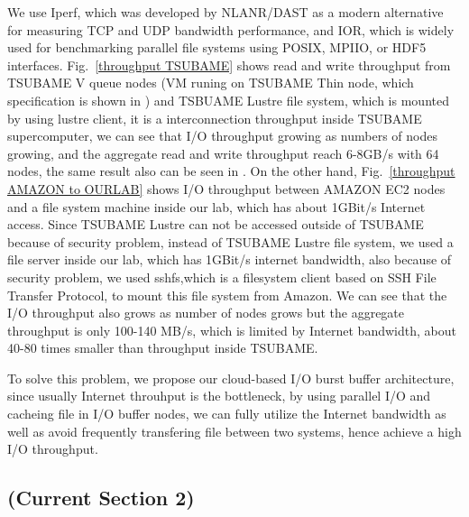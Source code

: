 We use Iperf\cite{iperf}, which was developed by NLANR/DAST as a modern alternative for measuring TCP and UDP bandwidth performance, and IOR\cite{IOR}, which is widely used for benchmarking parallel file systems using POSIX, MPIIO, or HDF5 interfaces.
Fig.~\ref{throughput TSUBAME} shows read and write throughput from TSUBAME V queue nodes (VM runing on TSUBAME Thin node, which specification is shown in ) and TSBUAME Lustre file system, which is mounted by using lustre client, it is a interconnection throughput inside TSUBAME supercomputer, we can see that I/O throughput growing as numbers of nodes growing, and the aggregate read and write throughput reach 6-8GB/s with 64 nodes, the same result also can be seen in \cite{checkpointing}.
On the other hand, Fig.~\ref{throughput AMAZON to OURLAB} shows I/O throughput between AMAZON EC2 nodes and a file system machine inside our lab, which has about 1GBit/s Internet access.
Since TSUBAME Lustre can not be accessed outside of TSUBAME because of security problem, instead of TSUBAME Lustre file system, we used a file server inside our lab, which has 1GBit/s internet bandwidth, also because of security problem, we used sshfs\cite{sshfs},which is a filesystem client based on SSH File Transfer Protocol, to mount this file system from Amazon.
We can see that the I/O throughput also grows as number of nodes grows but the aggregate throughput is only 100-140 MB/s, which is limited by Internet bandwidth, about 40-80 times smaller than throughput inside TSUBAME.

To solve this problem, we propose our cloud-based I/O burst buffer architecture, since usually Internet throuhput is the bottleneck, by using parallel I/O and cacheing file in I/O buffer nodes, we can fully utilize the Internet bandwidth as well as avoid frequently transfering file between two systems, hence achieve a high I/O throughput.



\subsection{(Current Section 2)}


